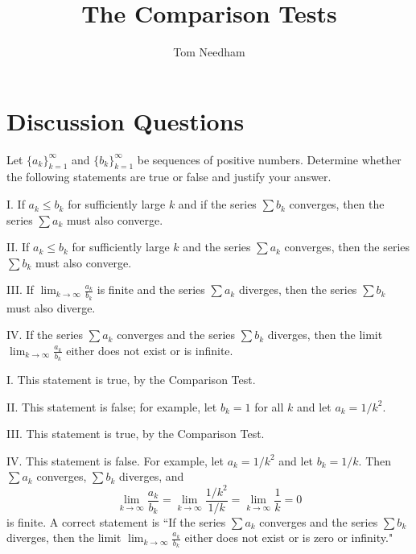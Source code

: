 \documentclass[noauthor]{ximera}
\author{Tom Needham}
\title[Collaborate:]{The Comparison Tests}
\begin{document}
\begin{abstract}
\end{abstract}
\maketitle

\vspace{-.9in}

\section{Discussion Questions}

\begin{problem}
Let $\{a_k\}_{k=1}^\infty$ and $\{b_k\}_{k=1}^\infty$ be sequences of positive numbers. Determine whether the following statements are true or false and justify your answer.

I. If $a_k \leq b_k$ for sufficiently large $k$ and if the series $\sum b_k$ converges, then the series $\sum a_k$ must also converge.

II. If $a_k \leq b_k$ for sufficiently large $k$ and the series $\sum a_k$ converges, then the series $\sum b_k$ must also converge. 

III. If $\lim_{k \rightarrow \infty} \frac{a_k}{b_k}$ is finite and the series $\sum a_k$ diverges, then the series $\sum b_k$ must also diverge.

IV. If the series $\sum a_k$ converges and the series $\sum b_k$ diverges, then the limit $\lim_{k \rightarrow \infty} \frac{a_k}{b_k}$ either does not exist or is infinite. 

\begin{freeResponse}
I. This statement is true, by the Comparison Test.

II. This statement is false; for example, let $b_k = 1$ for all $k$ and let $a_k = 1/k^2$. 

III. This statement is true, by the Comparison Test.

IV. This statement is false. For example, let $a_k = 1/k^2$ and let $b_k = 1/k$. Then $\sum a_k$ converges, $\sum b_k$ diverges, and
$$
\lim_{k \rightarrow \infty} \frac{a_k}{b_k} = \lim_{k \rightarrow \infty} \frac{1/k^2}{1/k} = \lim_{k \rightarrow \infty} \frac{1}{k} = 0
$$
is finite. A correct statement is ``If the series $\sum a_k$ converges and the series $\sum b_k$ diverges, then the limit $\lim_{k \rightarrow \infty} \frac{a_k}{b_k}$ either does not exist or is zero or infinity."
\end{freeResponse}
\end{problem}
\end{document}

